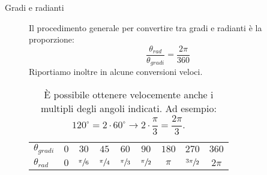 \documentclass[a4paper,11pt,italian]{article}
\begin{document}
\begin{description}

  \item[Gradi e radianti] Il procedimento generale per convertire tra gradi e radianti è la proporzione:
  \[ \frac{\theta_{rad}}{\theta_{gradi}} = \frac{2\pi}{360} \]
  Riportiamo inoltre in  alcune conversioni veloci.
  \begin{table}[htp]\centering
    \begin{tabular}{lcccccccc}\toprule
        \boldmath$ \theta_{gradi} $ & $ 0 $ & $ 30 $ & $ 45 $ & $ 60 $ & $ 90 $ & $ 180 $ & $ 270 $ & $ 360 $\\\addlinespace[.2em]\midrule
        \boldmath$ \theta_{rad} $ & $ 0 $ & $ \sfrac{\pi}{6} $ & $ \sfrac{\pi}{4} $ & $ \sfrac{\pi}{3} $ & $ \sfrac{\pi}{2} $ & $ \pi $ & $ \sfrac{3\pi}{2} $ & $ 2\pi $\\\bottomrule
    \end{tabular}
    \caption{È possibile ottenere velocemente anche i multipli degli angoli indicati. Ad esempio: $ 120^{\circ} = 2\cdot 60^{\circ} \rightarrow 2 \cdot \dfrac{\pi}{3} = \dfrac{2\pi}{3} $.}\label{tab:gradiradianti}
  \end{table}
\end{description}
\end{document}
